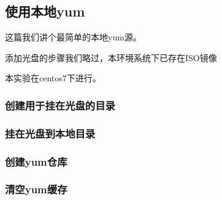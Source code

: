 \documentclass[letterpaper,10pt,english]{sphinxmanual}
\begin{document}
\subsection{使用本地yum}
\label{\detokenize{software_manage/yum/yum_iso_local:yum}}\label{\detokenize{software_manage/yum/yum_iso_local::doc}}
这篇我们讲个最简单的本地yum源。

添加光盘的步骤我们略过，本环境系统下已存在ISO镜像

本实验在centos7下进行。


\subsubsection{创建用于挂在光盘的目录}
\label{\detokenize{software_manage/yum/yum_iso_local:id1}}
%
\begin{sphinxVerbatim}[commandchars=\\\{\}]
 
\end{sphinxVerbatim}


\subsubsection{挂在光盘到本地目录}
\label{\detokenize{software_manage/yum/yum_iso_local:id2}}
%
\begin{sphinxVerbatim}[commandchars=\\\{\}]
  
\end{sphinxVerbatim}


\subsubsection{创建yum仓库}
\label{\detokenize{software_manage/yum/yum_iso_local:id3}}
%
\begin{sphinxVerbatim}[commandchars=\\\{\}]
 
\PYG{p}{[}\PYG{p}{]}
\end{sphinxVerbatim}


\subsubsection{清空yum缓存}
\label{\detokenize{software_manage/yum/yum_iso_local:id4}}
%
\begin{sphinxVerbatim}[commandchars=\\\{\}]
  
\end{sphinxVerbatim}
\end{document}
